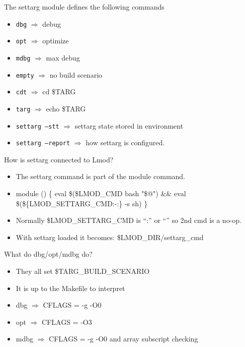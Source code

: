\documentclass{beamer}
\begin{document}
\begin{frame}{The settarg module defines the following commands}
  \begin{itemize}
    \item \texttt{dbg} $\Rightarrow$ debug
    \item \texttt{opt} $\Rightarrow$ optimize
    \item \texttt{mdbg} $\Rightarrow$ max debug
    \item \texttt{empty} $\Rightarrow$ no build scenario 
    \item \texttt{cdt}   $\Rightarrow$ cd \$TARG
    \item \texttt{targ}   $\Rightarrow$ echo \$TARG
    \item \texttt{settarg --stt} $\Rightarrow$ settarg state stored in
      environment
    \item \texttt{settarg --report} $\Rightarrow$ how settarg is configured.
  \end{itemize}
\end{frame}

\begin{frame}{How is settarg connected to Lmod?}
  \begin{itemize}
    \item The settarg command is part of the module command.
    \item module () \{ eval \$(\$LMOD\_CMD bash "\$@") \&\&
             eval \$(\$\{LMOD\_SETTARG\_CMD:-:\} -s sh) \}
    \item Normally \$LMOD\_SETTARG\_CMD is ``:'' or ``'' so 2nd cmd is a
      no-op.
    \item With settarg loaded it becomes: \$LMOD\_DIR/settarg\_cmd
  \end{itemize}
\end{frame}

\begin{frame}{What do dbg/opt/mdbg do?}
  \begin{itemize}
    \item They all set \$TARG\_BUILD\_SCENARIO
    \item It is up to the Makefile to interpret
    \item dbg $\Rightarrow$ CFLAGS = -g -O0
    \item opt $\Rightarrow$ CFLAGS = -O3
    \item mdbg $\Rightarrow$ CFLAGS = -g -O0 and array subscript checking
  \end{itemize}
\end{frame}
\end{document}
